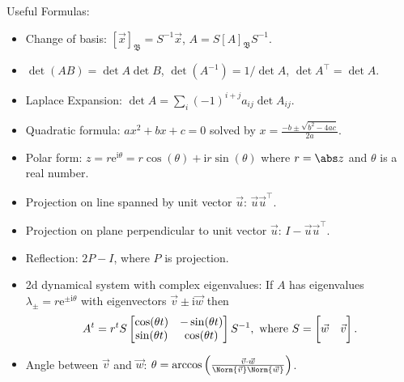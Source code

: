 \documentclass[addpoints]{exam}
\DeclarePairedDelimiter{\Norm}\lVert\rVert
\DeclarePairedDelimiter{\abs}\lvert\rvert
\newcommand{\tr}{\intercal}
\newcommand{\I}{\mathrm{i}}
\newcommand{\e}{\mathrm{e}}
\newcommand{\frakB}{\mathfrak{B}}
\begin{document}
\noindent Useful Formulas:
\begin{itemize}
\item Change of basis: $[\vec x]_\frakB = S^{-1} \vec x$, $A = S [A]_\frakB S^{-1}$.
\item $\det(AB) = \det A \det B$, $\det(A^{-1}) = 1/\det A$, $\det A^\tr = \det A$.
\item Laplace Expansion: $\det A = \sum_i (-1)^{i+j} a_{ij} \det A_{ij}$.
\item Quadratic formula: $ax^2 + bx + c = 0$ solved by $x = \frac{-b\pm\sqrt{b^2 -4ac}}{2a}$.
\item Polar form: $z = r \e^{\I \theta} = r \cos(\theta) + \I r \sin(\theta)$ where $r = \abs z$ and $\theta$ is a real number.
\item Projection on line spanned by unit vector $\vec u$: $\vec u \vec u^\tr$.
\item Projection on plane perpendicular to unit vector $\vec u$: $I - \vec u \vec u^\tr$.
\item Reflection: $2P-I$, where $P$ is projection.
\item 2d dynamical system with complex eigenvalues: If $A$ has eigenvalues $\lambda_\pm = r \e^{\pm \I \theta}$ with eigenvectors $\vec v \pm \I \vec w$ then
\[A^t = r^t S \begin{bmatrix}
\cos(\theta t) & -\sin(\theta t) \\
\sin(\theta t) & \cos(\theta t)
\end{bmatrix}
S^{-1},\text{ where } S = \begin{bmatrix}
\vphantom{\begin{bmatrix}w\\w\end{bmatrix}}\vec w & \vec v
\end{bmatrix}.\]
\item Angle between $\vec v$ and $\vec w$: $\theta = \arccos\left(\frac{\vec v \cdot \vec w}{\Norm{\vec v} \Norm{\vec w}}\right)$.
\end{itemize}


\end{document}
